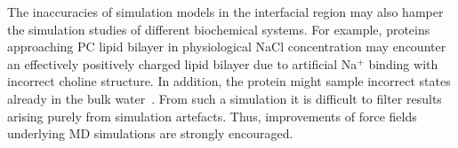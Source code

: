 \documentclass[aps,prl,superscriptaddress,twocolumn]{revtex4}
\begin{document}
The inaccuracies of simulation models in the interfacial region may also hamper the simulation 
studies of different biochemical systems. For example, proteins approaching
PC lipid bilayer in physiological NaCl concentration may encounter an effectively positively charged 
lipid bilayer due to artificial Na$^+$ binding with incorrect choline structure. In addition,
the protein might sample incorrect states already in the bulk water~\cite{best11,beauchamp12,rauscher15}.
From such a simulation it is difficult to filter results arising purely from simulation artefacts. Thus, improvements of force fields underlying MD simulations are strongly encouraged.





%

\begin{acknowledgments}
\end{acknowledgments}



\onecolumngrid
\listoftodos
\end{document}
